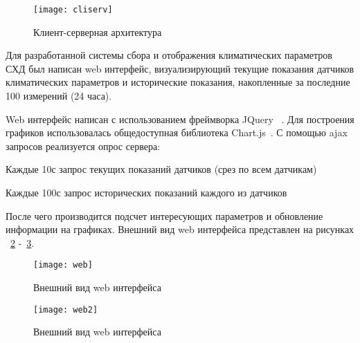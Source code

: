\begin{figure}[h]
	\centering
	\texttt{[image: cliserv]}
	\caption{Клиент-серверная архитектура}
	\label{fig:cliserv}
\end{figure}

Для разработанной системы сбора и отображения климатических параметров СХД был написан web интерфейс, визуализирующий текущие показания датчиков климатических параметров и исторические показания, накопленные за последние 100 измерений (24 часа). 

Web интерфейс написан с использованием фреймворка JQuery ~\cite{jQuery}. Для построения графиков использовалась общедоступная библиотека Chart.js~\cite{Chartjs}. С помощью ajax запросов реализуется опрос сервера: 
\begin{itemize*}
	\item{Каждые 10с запрос текущих показаний датчиков (срез по всем датчикам)}
	\item{Каждые 100с запрос исторических показаний каждого из датчиков}
\end{itemize*}

После чего производится подсчет интересующих параметров и обновление информации на графиках.
Внешний вид web интерфейса представлен на рисунках ~\ref{fig:web} -~\ref{fig:web2}.
\begin{figure}[h]
	\centering
	\texttt{[image: web]}
	\caption{Внешний вид web интерфейса}
	\label{fig:web}
\end{figure}

\begin{figure}[h]
	\centering
	\texttt{[image: web2]}
	\caption{Внешний вид web интерфейса}
	\label{fig:web2}
\end{figure}





%
%





